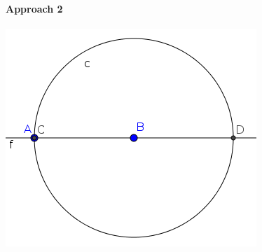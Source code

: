 \documentclass{article}
\begin{document}
\paragraph{Approach 2}
\begin{center}
\includegraphics[scale=0.5]{limitations-Thales2-1}
\end{center}
\end{document}
